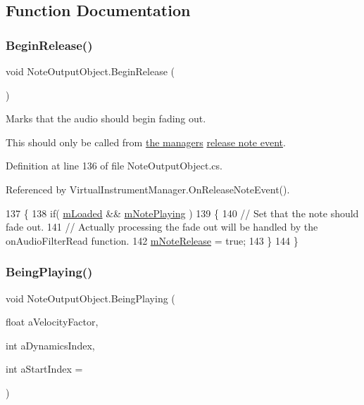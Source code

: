\subsection{Function Documentation}
\mbox{\label{group___n_o_o_pub_func_ga044e62759958d717c7fa4fd1615e2ec1}} 
\subsubsection{\texorpdfstring{Begin\+Release()}{BeginRelease()}}
{\footnotesize\ttfamily void Note\+Output\+Object.\+Begin\+Release (\begin{DoxyParamCaption}{ }\end{DoxyParamCaption})}



Marks that the audio should begin fading out. 

This should only be called from \hyperlink{group___v_i_m}{the manager\textquotesingle{}s} \hyperlink{group___v_i_m_events_ga3a1726a6366126421434c2c7be5e5678}{release note event}. 

Definition at line 136 of file Note\+Output\+Object.\+cs.



Referenced by Virtual\+Instrument\+Manager.\+On\+Release\+Note\+Event().


\begin{DoxyCode}
137     \{
138         \textcolor{keywordflow}{if}( \hyperlink{group___n_o_o_priv_var_gaf01d2583555de6a523cdf82808718ca9}{mLoaded} && \hyperlink{group___n_o_o_priv_var_ga4417170b8fa977f05a0b4cd0d16412fd}{mNotePlaying} )
139         \{
140             \textcolor{comment}{// Set that the note should fade out. }
141             \textcolor{comment}{// Actually processing the fade out will be handled by the onAudioFilterRead function.}
142             \hyperlink{group___n_o_o_priv_var_ga88bfcc80d0cd20c81cd89d19d3231b84}{mNoteRelease} = \textcolor{keyword}{true};
143         \}
144     \}
\end{DoxyCode}
\mbox{\label{group___n_o_o_pub_func_ga2bdaa2787408f353f71ef6c6a18e9285}} 
\subsubsection{\texorpdfstring{Being\+Playing()}{BeingPlaying()}}
{\footnotesize\ttfamily void Note\+Output\+Object.\+Being\+Playing (\begin{DoxyParamCaption}\item[{float}]{a\+Velocity\+Factor,  }\item[{int}]{a\+Dynamics\+Index,  }\item[{int}]{a\+Start\+Index = {} }\end{DoxyParamCaption})}



